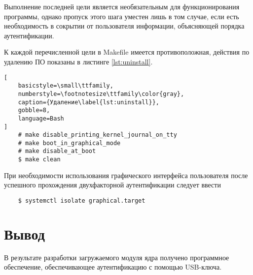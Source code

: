 Выполнение последней цели является необязательным для функционирования программы, однако пропуск этого шага уместен лишь в том случае, если есть необходимость в сокрытии от пользователя информации, объясняющей порядка аутентификации.

К каждой перечисленной цели в Makefile имеется противоположная, действия по удалению ПО показаны в листинге \ref{lst:uninstall}.

\begin{lstlisting}[
	basicstyle=\small\ttfamily,
	numberstyle=\footnotesize\ttfamily\color{gray},
	caption={Удаление\label{lst:uninstall}},
	gobble=8,
	language=Bash
]
	# make disable_printing_kernel_journal_on_tty
	# make boot_in_graphical_mode
	# make disable_at_boot
	$ make clean
\end{lstlisting}

При необходимости использования графического интерфейса пользователя после успешного прохождения двухфакторной аутентификации следует ввести

\begin{verbatim}
	$ systemctl isolate graphical.target
\end{verbatim}

\section*{Вывод}

В результате разработки загружаемого модуля ядра получено программное обеспечение, обеспечивающее аутентификацию с помощью USB-ключа.